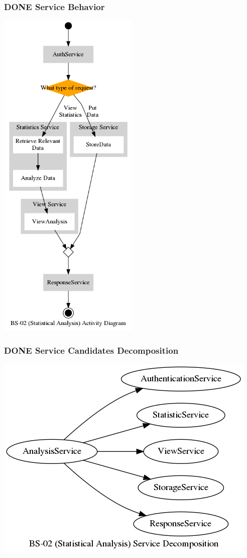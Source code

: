 \documentclass[11pt]{article}
\begin{document}
\subsubsection{{\bfseries\sffamily DONE} Service Behavior}
\label{sec:org3c3d463}
\begin{center}
\includegraphics[height=16.3cm]{res/bs_02_act.png}
\end{center}
\subsubsection{{\bfseries\sffamily DONE} Service Candidates Decomposition}
\label{sec:orgdfc1161}
\begin{center}
\includegraphics[width=.9\linewidth]{res/bs_02_dcmp.png}
\end{center}
\newpage
\end{document}
